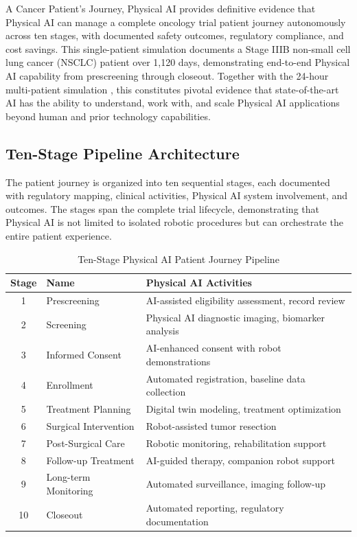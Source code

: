 
A Cancer Patient's Journey, Physical AI \cite{patient-journey-paper} provides
definitive evidence that Physical AI can manage a complete oncology trial
patient journey autonomously across ten stages, with documented safety
outcomes, regulatory compliance, and cost savings. This single-patient
simulation documents a Stage IIIB non-small cell lung cancer (NSCLC) patient
over 1,120 days, demonstrating end-to-end Physical AI capability from
prescreening through closeout. Together with the 24-hour multi-patient
simulation \cite{site-docs}, this constitutes pivotal evidence that
state-of-the-art AI has the ability to understand, work with, and scale
Physical AI applications beyond human and prior technology capabilities.

\subsection{Ten-Stage Pipeline Architecture}
\label{subsec:journey-pipeline}

The patient journey is organized into ten sequential stages, each documented
with regulatory mapping, clinical activities, Physical AI system involvement,
and outcomes. The stages span the complete trial lifecycle, demonstrating that
Physical AI is not limited to isolated robotic procedures but can orchestrate
the entire patient experience.

\begin{table}[H]
\centering
\caption{Ten-Stage Physical AI Patient Journey Pipeline}
\label{tab:journey-stages}
\small
\begin{tabularx}{\textwidth}{c l X}
\toprule
\textbf{Stage} & \textbf{Name} & \textbf{Physical AI Activities} \\
\midrule
1 & Prescreening & AI-assisted eligibility assessment, record review \\
2 & Screening & Physical AI diagnostic imaging, biomarker analysis \\
3 & Informed Consent & AI-enhanced consent with robot demonstrations \\
4 & Enrollment & Automated registration, baseline data collection \\
5 & Treatment Planning & Digital twin modeling, treatment optimization \\
6 & Surgical Intervention & Robot-assisted tumor resection \\
7 & Post-Surgical Care & Robotic monitoring, rehabilitation support \\
8 & Follow-up Treatment & AI-guided therapy, companion robot support \\
9 & Long-term Monitoring & Automated surveillance, imaging follow-up \\
10 & Closeout & Automated reporting, regulatory documentation \\
\bottomrule
\end{tabularx}
\end{table}

